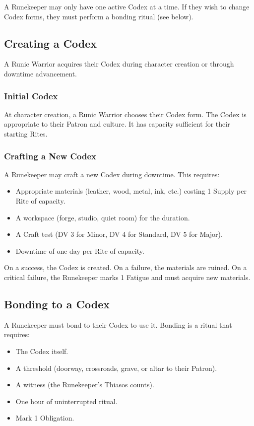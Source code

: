 A Runekeeper may only have one active Codex at a time. If they wish to change Codex forms, they must perform a bonding ritual (see below).

\subsection{Creating a Codex}

A Runic Warrior acquires their Codex during character creation or through downtime advancement.

\subsubsection{Initial Codex}

At character creation, a Runic Warrior chooses their Codex form. The Codex is appropriate to their Patron and culture. It has capacity sufficient for their starting Rites.

\subsubsection{Crafting a New Codex}

A Runekeeper may craft a new Codex during downtime. This requires:

\begin{itemize}
\item Appropriate materials (leather, wood, metal, ink, etc.) costing 1 Supply per Rite of capacity.
\item A workspace (forge, studio, quiet room) for the duration.
\item A Craft test (DV 3 for Minor, DV 4 for Standard, DV 5 for Major).
\item Downtime of one day per Rite of capacity.
\end{itemize}

On a success, the Codex is created. On a failure, the materials are ruined. On a critical failure, the Runekeeper marks 1 Fatigue and must acquire new materials.

\subsection{Bonding to a Codex}

A Runekeeper must bond to their Codex to use it. Bonding is a ritual that requires:

\begin{itemize}
\item The Codex itself.
\item A threshold (doorway, crossroads, grave, or altar to their Patron).
\item A witness (the Runekeeper's Thiasos counts).
\item One hour of uninterrupted ritual.
\item Mark 1 Obligation.
\end{itemize}

